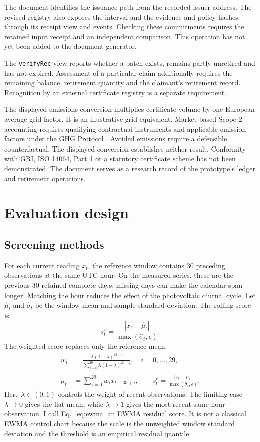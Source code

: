 \documentclass[11pt,a4paper]{article}
\newcommand{\code}[1]{\texttt{\small #1}}
\begin{document}
The document identifies the issuance path from the recorded issuer address. The revised registry also exposes the interval and the evidence and policy hashes through its receipt view and events. Checking these commitments requires the retained input receipt and an independent comparison. This operation has not yet been added to the document generator.

The \code{verifyRec} view reports whether a batch exists, remains partly unretired and has not expired. Assessment of a particular claim additionally requires the remaining balance, retirement quantity and the claimant's retirement record. Recognition by an external certificate registry is a separate requirement.

The displayed emissions conversion multiplies certificate volume by one European average grid factor. It is an illustrative grid equivalent. Market based Scope 2 accounting requires qualifying contractual instruments and applicable emission factors under the GHG Protocol \cite{scope2}. Avoided emissions require a defensible counterfactual. The displayed conversion establishes neither result. Conformity with GRI, ISO 14064, Part 1 or a statutory certificate scheme has not been demonstrated. The document serves as a research record of the prototype's ledger and retirement operations.

\section{Evaluation design}
\subsection{Screening methods}
For each current reading $x_t$, the reference window contains 30 preceding observations at the same UTC hour. On the measured series, these are the previous 30 retained complete days; missing days can make the calendar span longer. Matching the hour reduces the effect of the photovoltaic diurnal cycle. Let $\widehat\mu_t$ and $\widehat\sigma_t$ be the window mean and sample standard deviation. The rolling score is
\begin{equation}s_t^{z}=\frac{|x_t-\widehat\mu_t|}{\max(\widehat\sigma_t,\epsilon)}.\label{eq:z}\end{equation}
The weighted score replaces only the reference mean:
\begin{align}
w_i&=\frac{\lambda(1-\lambda)^{29-i}}{\sum_{j=0}^{29}\lambda(1-\lambda)^{29-j}},\quad i=0,\ldots,29,\label{eq:weights}\\
\widetilde\mu_t&=\sum_{i=0}^{29}w_i x_{t-30+i},\qquad
s_t^{e}=\frac{|x_t-\widetilde\mu_t|}{\max(\widehat\sigma_t,\epsilon)}.\label{eq:ewma}
\end{align}
Here $\lambda\in(0,1)$ controls the weight of recent observations. The limiting case $\lambda\to0$ gives the flat mean, while $\lambda\to1$ gives the most recent same hour observation. I call Eq.~\eqref{eq:ewma} an EWMA residual score. It is not a classical EWMA control chart because the scale is the unweighted window standard deviation and the threshold is an empirical residual quantile.
\end{document}
